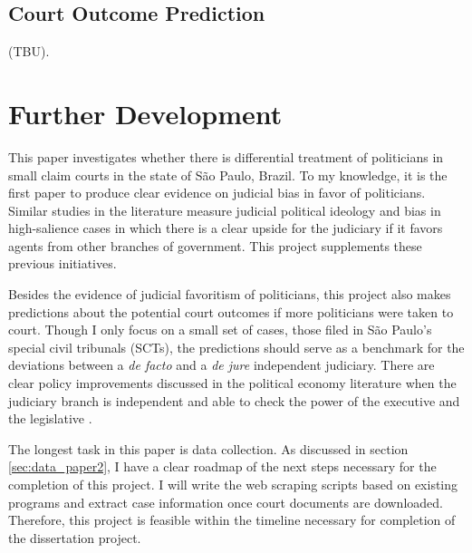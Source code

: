 \documentclass[11pt]{article}
\begin{document}
\subsection{Court Outcome Prediction} \label{subsec:methods2_paper2}

(TBU).

\section{Further Development} \label{sec:conclusion_paper2}

This paper investigates whether there is differential treatment of politicians in small claim courts in the state of São Paulo, Brazil. To my knowledge, it is the first paper to produce clear evidence on judicial bias in favor of politicians. Similar studies in the literature measure judicial political ideology and bias in high-salience cases in which there is a clear upside for the judiciary if it favors agents from other branches of government. This project supplements these previous initiatives.

Besides the evidence of judicial favoritism of politicians, this project also makes predictions about the potential court outcomes if more politicians were taken to court. Though I only focus on a small set of cases, those filed in São Paulo's special civil tribunals (SCTs), the predictions should serve as a benchmark for the deviations between a \emph{de facto} and a \emph{de jure} independent judiciary. There are clear policy improvements discussed in the political economy literature when the judiciary branch is independent and able to check the power of the executive and the legislative \citep{BalandChapter69Governance2010}.

The longest task in this paper is data collection. As discussed in section \ref{sec:data_paper2}, I have a clear roadmap of the next steps necessary for the completion of this project. I will write the web scraping scripts based on existing programs and extract case information once court documents are downloaded. Therefore, this project is feasible within the timeline necessary for completion of the dissertation project.


\clearpage

\setlength\bibsep{0pt}


\end{document}
